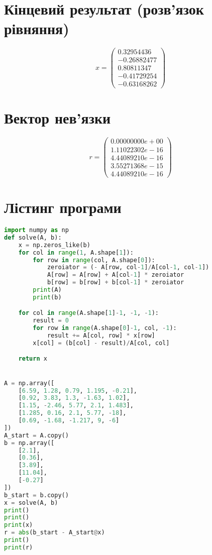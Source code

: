 \documentclass{article}
\begin{document}
    \section{Кінцевий результат (розв’язок рівняння)}
$$ x = 
\left( \begin{matrix}
    0.32954436\\
    -0.26882477\\
    0.80811347\\
    -0.41729254\\
    -0.63168262
\end{matrix}\right)
$$
    \section{Вектор нев’язки}
$$ r = 
\left( \begin{matrix}
    0.00000000e+00\\
    1.11022302e-16\\
    4.44089210e-16\\
    3.55271368e-15\\
    4.44089210e-16
\end{matrix}\right)
$$

    \section{Лістинг програми}
    \begin{lstlisting}[language=Python, caption=Bisect]
import numpy as np
def solve(A, b):
    x = np.zeros_like(b)
    for col in range(1, A.shape[1]):
        for row in range(col, A.shape[0]):
            zeroiator = (- A[row, col-1]/A[col-1, col-1])
            A[row] = A[row] + A[col-1] * zeroiator
            b[row] = b[row] + b[col-1] * zeroiator
        print(A)
        print(b)

    for col in range(A.shape[1]-1, -1, -1):
        result = 0
        for row in range(A.shape[0]-1, col, -1):
            result += A[col, row] * x[row]
        x[col] = (b[col] - result)/A[col, col]

    return x


A = np.array([
    [6.59, 1.28, 0.79, 1.195, -0.21],
    [0.92, 3.83, 1.3, -1.63, 1.02],
    [1.15, -2.46, 5.77, 2.1, 1.483],
    [1.285, 0.16, 2.1, 5.77, -18],
    [0.69, -1.68, -1.217, 9, -6]
])
A_start = A.copy()
b = np.array([
    [2.1],
    [0.36],
    [3.89],
    [11.04],
    [-0.27]
])
b_start = b.copy()
x = solve(A, b)
print()
print()
print(x)
r = abs(b_start - A_start@x)
print()
print(r)
    \end{lstlisting}
\end{document}

